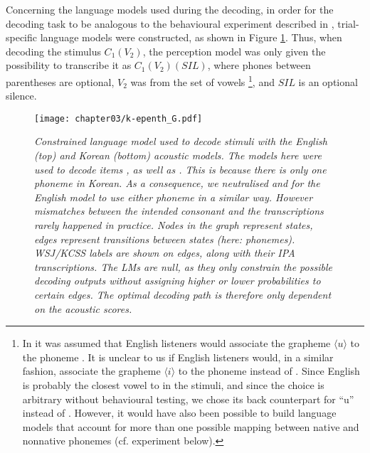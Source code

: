 {Concerning the language models used during the decoding, in order for the decoding task to be analogous to the behavioural experiment described in \cite{durvasula2015}, trial-specific language models were constructed, as shown in Figure \ref{fig:k-epenth_G}. Thus, when decoding the stimulus $C_{1}(V_{2})$, the perception model was only given the possibility to transcribe it as $C_{1}(V_{2})(SIL)$, where phones between parentheses are optional, $V_{2}$ was from the set of vowels \footnote{In \cite{durvasula2015} it was assumed that English listeners would associate the grapheme $\langle u \rangle$ to the phoneme . It is unclear to us if English listeners would, in a similar fashion, associate the grapheme $\langle i \rangle$ to the phoneme  instead of . Since English  is probably the closest vowel to \textipa{[i]} in the stimuli, and since the choice is arbitrary without behavioural testing, we chose its back counterpart  for ``u'' instead of . However, it would have also been possible to build language models that account for more than one possible mapping between native and nonnative phonemes (cf. experiment below).}, and $SIL$ is an optional silence. 

\begin{figure}[htb]
    \centering
    \texttt{[image: chapter03/k-epenth\_G.pdf]}
    \caption{\textit{Constrained language model used to decode stimuli with the English (top) and Korean (bottom) acoustic models. The models here were used to decode items , as well as . This is because there is only one  phoneme in Korean. As a consequence, we neutralised  and  for the English model to use either phoneme in a similar way. However mismatches between the intended consonant and the transcriptions rarely happened in practice. Nodes in the graph represent states, edges represent transitions between states (here: phonemes). WSJ/KCSS labels are shown on edges, along with their IPA transcriptions. The LMs are null, as they only constrain the possible decoding outputs without assigning higher or lower probabilities to certain edges. The optimal decoding path is therefore only dependent on the acoustic scores.}}
    \label{fig:k-epenth_G}
  \end{figure}
  
}
